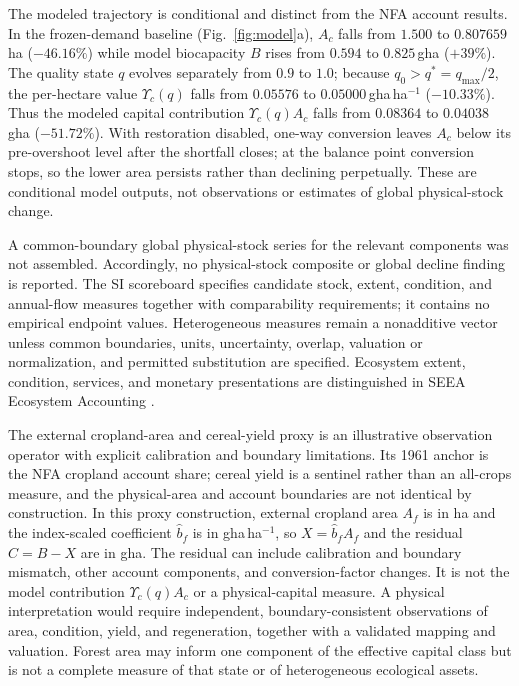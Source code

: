 \documentclass[preprint,12pt,authoryear]{elsarticle}
\newcommand{\Ups}{\Upsilon_c}
\begin{document}
The modeled trajectory is conditional and distinct from the NFA account results. In the frozen-demand baseline (Fig.~\ref{fig:model}a), $A_c$ falls from $1.500$ to $0.807659$\,ha ($-46.16\%$) while model biocapacity $B$ rises from $0.594$ to $0.825$\,gha ($+39\%$). The quality state $q$ evolves separately from $0.9$ to $1.0$; because $q_0>q^*=q_{\max}/2$, the per-hectare value $\Ups(q)$ falls from $0.05576$ to $0.05000$\,gha\,ha$^{-1}$ ($-10.33\%$). Thus the modeled capital contribution $\Ups(q)A_c$ falls from $0.08364$ to $0.04038$\,gha ($-51.72\%$). With restoration disabled, one-way conversion leaves $A_c$ below its pre-overshoot level after the shortfall closes; at the balance point conversion stops, so the lower area persists rather than declining perpetually. These are conditional model outputs, not observations or estimates of global physical-stock change.

A common-boundary global physical-stock series for the relevant components was not assembled. Accordingly, no physical-stock composite or global decline finding is reported. The SI scoreboard specifies candidate stock, extent, condition, and annual-flow measures together with comparability requirements; it contains no empirical endpoint values. Heterogeneous measures remain a nonadditive vector unless common boundaries, units, uncertainty, overlap, valuation or normalization, and permitted substitution are specified. Ecosystem extent, condition, services, and monetary presentations are distinguished in SEEA Ecosystem Accounting \citep{UN2021SEEA_EA}.

The external cropland-area and cereal-yield proxy is an illustrative observation operator with explicit calibration and boundary limitations. Its 1961 anchor is the NFA cropland account share; cereal yield is a sentinel rather than an all-crops measure, and the physical-area and account boundaries are not identical by construction. In this proxy construction, external cropland area $A_f$ is in ha and the index-scaled coefficient $\hat b_f$ is in gha\,ha$^{-1}$, so $X=\hat b_fA_f$ and the residual $C=B-X$ are in gha. The residual can include calibration and boundary mismatch, other account components, and conversion-factor changes. It is not the model contribution $\Ups(q)A_c$ or a physical-capital measure. A physical interpretation would require independent, boundary-consistent observations of area, condition, yield, and regeneration, together with a validated mapping and valuation. Forest area may inform one component of the effective capital class but is not a complete measure of that state or of heterogeneous ecological assets.
\end{document}
